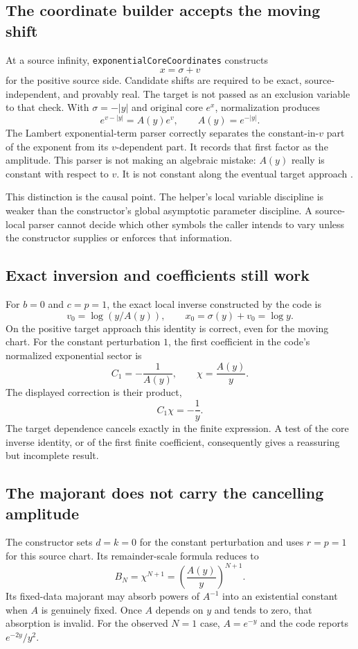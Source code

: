 \documentclass[11pt,letterpaper]{article}
\newcommand{\code}[1]{\texttt{#1}}
\begin{document}
\subsection{The coordinate builder accepts the moving shift}
At a source infinity, \code{exponentialCoreCoordinates} constructs
\[
 x=\sigma+v
\]
for the positive source side. Candidate shifts are required to be exact, source-independent, and provably real. The target is not passed as an exclusion variable to that check. With $\sigma=-|y|$ and original core $e^x$, normalization produces
\[
 e^{v-|y|}=A(y)e^v,\qquad A(y)=e^{-|y|}.
\]
The Lambert exponential-term parser correctly separates the constant-in-$v$ part of the exponent from its $v$-dependent part. It records that first factor as the amplitude. This parser is not making an algebraic mistake: $A(y)$ really is constant with respect to $v$. It is not constant along the eventual target approach \cite{lambert}.

This distinction is the causal point. The helper's local variable discipline is weaker than the constructor's global asymptotic parameter discipline. A source-local parser cannot decide which other symbols the caller intends to vary unless the constructor supplies or enforces that information.

\subsection{Exact inversion and coefficients still work}
For $b=0$ and $c=p=1$, the exact local inverse constructed by the code is
\[
 v_0=\log(y/A(y)),\qquad x_0=\sigma(y)+v_0=\log y.
\]
On the positive target approach this identity is correct, even for the moving chart. For the constant perturbation $1$, the first coefficient in the code's normalized exponential sector is
\[
 C_1=-\frac{1}{A(y)},\qquad
 \chi=\frac{A(y)}{y}.
\]
The displayed correction is their product,
\[
 C_1\chi=-\frac1y.
\]
The target dependence cancels exactly in the finite expression. A test of the core inverse identity, or of the first finite coefficient, consequently gives a reassuring but incomplete result.

\subsection{The majorant does not carry the cancelling amplitude}
The constructor sets $d=k=0$ for the constant perturbation and uses $r=p=1$ for this source chart. Its remainder-scale formula reduces to
\[
 B_N=\chi^{N+1}=\left(\frac{A(y)}{y}\right)^{N+1}.
\]
Its fixed-data majorant may absorb powers of $A^{-1}$ into an existential constant when $A$ is genuinely fixed. Once $A$ depends on $y$ and tends to zero, that absorption is invalid. For the observed $N=1$ case, $A=e^{-y}$ and the code reports $e^{-2y}/y^2$.
\end{document}
